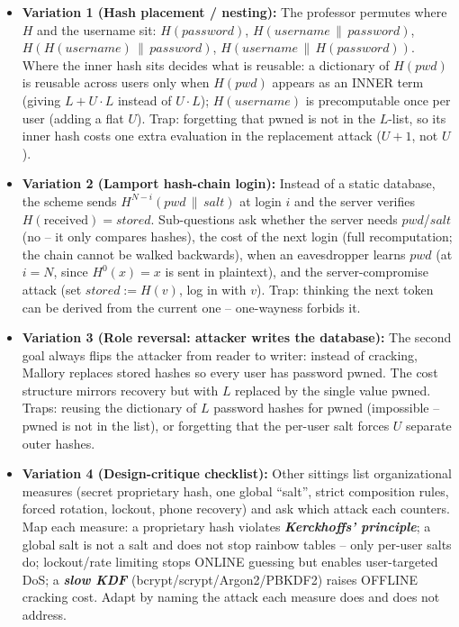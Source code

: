 \documentclass[12pt, a4paper]{article}
\newcommand{\term}[1]{\textbf{\textit{#1}}}        %
\begin{document}
\begin{trapbox}
\begin{itemize}
    \item \textbf{Variation 1 (Hash placement / nesting):} The professor permutes where $H$ and the username sit: $H(password)$, $H(username \,\|\, password)$, $H(H(username) \,\|\, password)$, $H(username \,\|\, H(password))$.
    Where the inner hash sits decides what is reusable: a dictionary of $H(pwd)$ is reusable across users only when $H(pwd)$ appears as an INNER term (giving $L + U \cdot L$ instead of $U \cdot L$); $H(username)$ is precomputable once per user (adding a flat $U$).
    Trap: forgetting that pwned is not in the $L$-list, so its inner hash costs one extra evaluation in the replacement attack ($U + 1$, not $U$).
    \item \textbf{Variation 2 (Lamport hash-chain login):} Instead of a static database, the scheme sends $H^{N-i}(pwd \,\|\, salt)$ at login $i$ and the server verifies $H(\text{received}) = stored$.
    Sub-questions ask whether the server needs $pwd$/$salt$ (no -- it only compares hashes), the cost of the next login (full recomputation; the chain cannot be walked backwards), when an eavesdropper learns $pwd$ (at $i = N$, since $H^{0}(x) = x$ is sent in plaintext), and the server-compromise attack (set $stored := H(v)$, log in with $v$). Trap: thinking the next token can be derived from the current one -- one-wayness forbids it.
    \item \textbf{Variation 3 (Role reversal: attacker writes the database):} The second goal always flips the attacker from reader to writer: instead of cracking, Mallory replaces stored hashes so every user has password pwned.
    The cost structure mirrors recovery but with $L$ replaced by the single value pwned. Traps: reusing the dictionary of $L$ password hashes for pwned (impossible -- pwned is not in the list), or forgetting that the per-user salt forces $U$ separate outer hashes.
    \item \textbf{Variation 4 (Design-critique checklist):} Other sittings list organizational measures (secret proprietary hash, one global ``salt'', strict composition rules, forced rotation, lockout, phone recovery) and ask which attack each counters.
    Map each measure: a proprietary hash violates \term{Kerckhoffs' principle}; a global salt is not a salt and does not stop rainbow tables -- only per-user salts do; lockout/rate limiting stops ONLINE guessing but enables user-targeted DoS;
    a \term{slow KDF} (bcrypt/scrypt/Argon2/PBKDF2) raises OFFLINE cracking cost. Adapt by naming the attack each measure does and does not address.
\end{itemize}
\end{trapbox}
\end{document}
